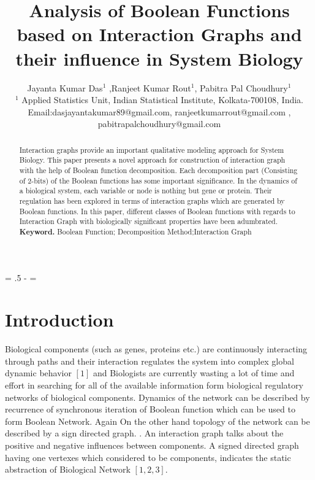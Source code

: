\documentclass{article}
\newcommand{\ls}[1]
    {\dimen0=\fontdimen6\the\font\lineskip=#1\dimen0
     \advance\lineskip.5\fontdimen5\the\font
     \advance\lineskip-\dimen0
     \lineskiplimit=0.9\lineskip
     \baselineskip=\lineskip
     \advance\baselineskip\dimen0
     \normallineskip\lineskip\normallineskiplimit\lineskiplimit
     \normalbaselineskip\baselineskip
     \ignorespaces}
\begin{document}


\title{Analysis of Boolean Functions based on Interaction Graphs and their influence in System Biology}
\author{Jayanta Kumar Das$^{1}$ ,Ranjeet Kumar Rout$^{1}$, Pabitra Pal Choudhury$^{1}$\\
\small $^{1}$ Applied Statistics Unit, Indian Statistical Institute, Kolkata-700108, India.\\
\small Email:dasjayantakumar89@gmail.com,
\small ranjeetkumarrout@gmail.com ,\\
\small pabitrapalchoudhury@gmail.com
}

\date{}
\maketitle

\thispagestyle{plain}
\setcounter{page}{1}
\ls{1.5}


\begin{abstract}
Interaction graphs provide an important qualitative modeling approach for System Biology. This paper presents a novel approach for construction of interaction graph with the help of Boolean function decomposition. Each decomposition part (Consisting of 2-bits) of the Boolean functions has some important significance. In the dynamics of a biological system, each variable or node is nothing but gene or protein. Their regulation has been explored in terms of interaction graphs which are generated by Boolean functions. In this paper, different classes of Boolean functions with regards to Interaction Graph with biologically significant properties have been  adumbrated.
{\bf Keyword.} Boolean Function;  Decomposition Method;Interaction Graph

\end{abstract}

\section{Introduction}
Biological components (such as genes, proteins etc.) are continuously interacting through paths and their interaction regulates  the system into complex global dynamic behavior $[1]$ and Biologists are currently wasting a lot of time and effort in searching for all of the available information form biological regulatory networks of biological components. Dynamics of the network can be described by recurrence of synchronous iteration of Boolean function which can be used to form Boolean Network. Again On the other hand topology of the network can be described by a sign directed graph. . An interaction graph talks about the positive and negative influences between components. A signed directed graph having one vertexes which considered to be components, indicates the static abstraction of Biological Network $[1, 2, 3]$.
\end{document}
